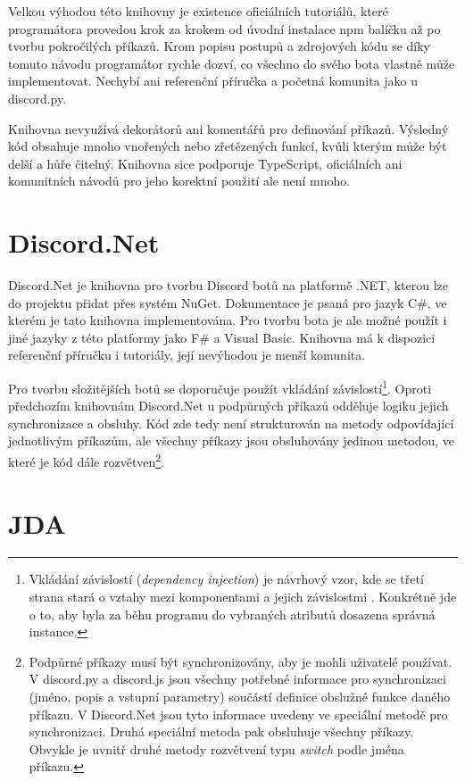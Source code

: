 \documentclass[FM]{tulthesis}
\begin{document}
	Velkou výhodou této knihovny je existence oficiálních tutoriálů, které programátora provedou krok za krokem od úvodní instalace npm balíčku až po tvorbu pokročilých příkazů. Krom popisu postupů a zdrojových kódu se díky tomuto návodu programátor rychle dozví, co všechno do svého bota vlastně může implementovat. Nechybí ani referenční příručka a početná komunita jako u discord.py.
	
	Knihovna nevyužívá dekorátorů ani komentářů pro definování příkazů. Výsledný kód obsahuje mnoho vnořených nebo zřetězených funkcí, kvůli kterým může být delší a hůře čitelný. Knihovna sice podporuje TypeScript, oficiálních ani komunitních návodů pro jeho korektní použití ale není mnoho.
	
	\section{Discord.Net}
	
	Discord.Net je knihovna pro tvorbu Discord botů na platformě .NET, kterou lze do projektu přidat přes systém NuGet. Dokumentace je psaná pro jazyk C\#, ve kterém je tato knihovna implementována. Pro tvorbu bota je ale možné použít i jiné jazyky z této platformy jako F\# a Visual Basic. Knihovna má k dispozici referenční příručku i tutoriály, její nevýhodou je menší komunita.
	
	 Pro tvorbu složitějších botů se doporučuje použít vkládání závislostí\footnote{Vkládání závislostí (\textit{dependency injection}) je návrhový vzor, kde se třetí strana stará o vztahy mezi komponentami a jejich závislostmi \cite{lit_distributedSystems}. Konkrétně jde o to, aby byla za běhu programu do vybraných atributů dosazena správná instance.}. Oproti předchozím knihovnám Discord.Net u podpůrných příkazů odděluje logiku jejich synchronizace a obsluhy. Kód zde tedy není strukturován na metody odpovídající jednotlivým příkazům, ale všechny příkazy jsou obsluhovány jedinou metodou, ve které je kód dále rozvětven\footnote{Podpůrné příkazy musí být synchronizovány, aby je mohli uživatelé používat. V discord.py a discord.js jsou všechny potřebné informace pro synchronizaci (jméno, popis a vstupní parametry) součástí definice obslužné funkce daného příkazu. V Discord.Net jsou tyto informace uvedeny ve speciální metodě pro synchronizaci. Druhá speciální metoda pak obsluhuje všechny příkazy. Obvykle je uvnitř druhé metody rozvětvení typu \textit{switch} podle jména příkazu.}.
	
	\section{JDA}
	
\end{document}
